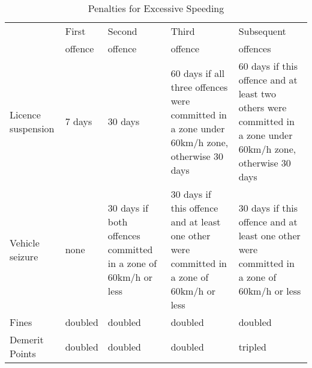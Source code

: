
\begin{table}%
\centering
\begin{tabular}{p{1.5cm} p{1.5cm} p{2cm} p{2.5cm} p{2.5cm}}
  \hline
     				& First  	& Second	& Third 	& Subsequent  \\ 
				& offence	& offence	& offence 	& offences \\
  \hline
Licence suspension
	&  7 days
		& 30 days
			& 60 days if all three offences were committed in a zone under 60km/h zone, 
				otherwise 30 days
				& 60 days if this offence and at least two others were committed 
					in a zone under 60km/h zone, otherwise 30 days \\
   \hline
Vehicle seizure 
	& none
		& 30 days if both offences committed in a zone of 60km/h or less
			& 30 days if this offence and at least one other were committed 
				in a zone of 60km/h or less
				& 30 days if this offence and at least one other were committed 
					in a zone of 60km/h or less \\
   \hline
Fines			& doubled			& doubled			& doubled			& doubled \\
   \hline
Demerit Points	& doubled			& doubled			& doubled			& tripled \\
   \hline
\end{tabular}
\caption{Penalties for Excessive Speeding} 
\label{tab:penalties}
\end{table}